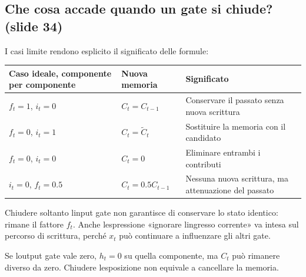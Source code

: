\documentclass[11pt,a4paper,oneside,openany]{book}
\begin{document}
\subsection{Che cosa accade quando un gate si chiude? (slide 34)}\label{f03-r801}

I casi limite rendono esplicito il significato delle formule:

\begin{longtable}[]{@{}
  >{\raggedright\arraybackslash}p{}
  >{\raggedright\arraybackslash}p{}
  >{\raggedright\arraybackslash}p{}@{}}
\toprule\noalign{}
\begin{minipage}[b]{\linewidth}\raggedright
Caso ideale, componente per componente
\end{minipage} & \begin{minipage}[b]{\linewidth}\raggedright
Nuova memoria
\end{minipage} & \begin{minipage}[b]{\linewidth}\raggedright
Significato
\end{minipage} \\
\midrule\noalign{}
\endhead
\bottomrule\noalign{}
\endlastfoot
\(f_t=1\), \(i_t=0\) & \(C_t=C_{t-1}\) & Conservare il passato senza nuova scrittura \\
\(f_t=0\), \(i_t=1\) & \(C_t=\widetilde C_t\) & Sostituire la memoria con il candidato \\
\(f_t=0\), \(i_t=0\) & \(C_t=0\) & Eliminare entrambi i contributi \\
\(i_t=0\), \(f_t=0.5\) & \(C_t=0.5C_{t-1}\) & Nessuna nuova scrittura, ma attenuazione del passato \\
\end{longtable}

Chiudere soltanto l\textquotesingle input gate non garantisce di conservare lo stato identico: rimane il fattore \(f_t\). Anche l\textquotesingle espressione «ignorare l\textquotesingle ingresso corrente» va intesa sul percorso di scrittura, perché \(x_t\) può continuare a influenzare gli altri gate.

Se l\textquotesingle output gate vale zero, \(h_t=0\) su quella componente, ma \(C_t\) può rimanere diverso da zero. Chiudere l\textquotesingle esposizione non equivale a cancellare la memoria.
\end{document}
